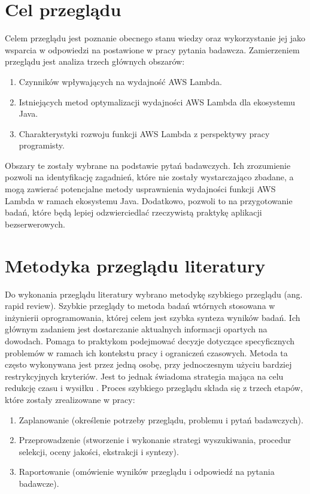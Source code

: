 \section{Cel przeglądu}\label{chapter:cel_przegladu}

Celem przeglądu jest poznanie obecnego stanu wiedzy oraz wykorzystanie jej jako wsparcia w odpowiedzi na postawione w pracy pytania badawcza. 
Zamierzeniem przeglądu jest analiza trzech głównych obszarów:

\begin{enumerate}
    \item Czynników wpływających na wydajność AWS Lambda.
    \item Istniejących metod optymalizacji wydajności AWS Lambda dla ekosystemu Java.
    \item Charakterystyki rozwoju funkcji AWS Lambda z perspektywy pracy programisty.
\end{enumerate}

Obszary te zostały wybrane na podstawie pytań badawczych. 
Ich zrozumienie pozwoli na identyfikację zagadnień, które nie zostały wystarczająco zbadane, 
a mogą zawierać potencjalne metody usprawnienia wydajności funkcji AWS Lambda w ramach ekosystemu Java.
Dodatkowo, pozwoli to na przygotowanie badań, które będą lepiej odzwierciedlać rzeczywistą praktykę aplikacji bezserwerowych.

\section{Metodyka przeglądu literatury}\label{chapter:metodyka_przegladu}

Do wykonania przeglądu literatury wybrano metodykę szybkiego przeglądu (ang. rapid review). 
Szybkie przeglądy to metoda badań wtórnych stosowana w inżynierii oprogramowania, której celem jest szybka synteza wyników badań.
Ich głównym zadaniem jest dostarczanie aktualnych informacji opartych na dowodach.
Pomaga to praktykom podejmować decyzje dotyczące specyficznych problemów w ramach ich kontekstu pracy i ograniczeń czasowych.
Metoda ta często wykonywana jest przez jedną osobę, przy jednoczesnym użyciu bardziej restrykcyjnych kryteriów.
Jest to jednak świadoma strategia mająca na celu redukcję czasu i wysiłku \cite{cartaxo2020rapidreviewssoftwareengineering}.
Proces szybkiego przeglądu składa się z trzech etapów, które zostały zrealizowane w pracy:

\begin{enumerate}
    \item Zaplanowanie (określenie potrzeby przeglądu, problemu i pytań badawczych).
    \item Przeprowadzenie (stworzenie i wykonanie strategi wyszukiwania, procedur selekcji, oceny jakości, ekstrakcji i syntezy).
    \item Raportowanie (omówienie wyników przeglądu i odpowiedź na pytania badawcze).
\end{enumerate}

